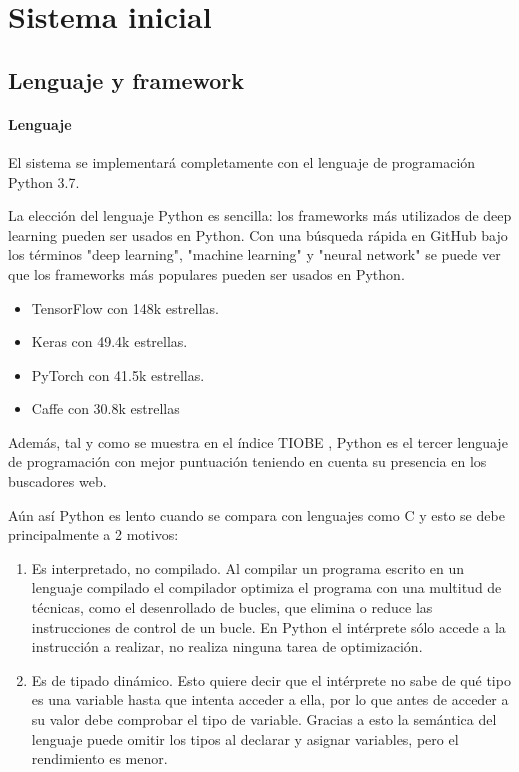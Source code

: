 \chapter{Sistema inicial}\label{initial_system}

\section{Lenguaje y framework}\label{sec:language_and_framework}

\subsubsection{Lenguaje}\label{subsec:language}

El sistema se implementará completamente con el lenguaje de programación Python 3.7.

La elección del lenguaje Python es sencilla: los frameworks más utilizados de deep learning pueden ser usados en Python. Con una búsqueda rápida en GitHub bajo los términos "deep learning", "machine learning" y "neural network" se puede ver que los frameworks más populares pueden ser usados en Python.
\begin{itemize}
\item TensorFlow con 148k estrellas.
\item Keras con 49.4k estrellas.
\item PyTorch con 41.5k estrellas.
\item Caffe con 30.8k estrellas
\end{itemize}

Además, tal y como se muestra en el índice TIOBE \cite{Tiobe2020}, Python es el tercer lenguaje de programación con mejor puntuación teniendo en cuenta su presencia en los buscadores web.

Aún así Python es lento cuando se compara con lenguajes como C y esto se debe principalmente a 2 motivos:
\begin{enumerate}
\item Es interpretado, no compilado. Al compilar un programa escrito en un lenguaje compilado el compilador optimiza el programa con una multitud de técnicas, como el desenrollado de bucles, que elimina o reduce las instrucciones de control de un bucle. En Python el intérprete sólo accede a la instrucción a realizar, no realiza ninguna tarea de optimización.
\item Es de tipado dinámico. Esto quiere decir que el intérprete no sabe de qué tipo es una variable hasta que intenta acceder a ella, por lo que antes de acceder a su valor debe comprobar el tipo de variable. Gracias a esto la semántica del lenguaje puede omitir los tipos al declarar y asignar variables, pero el rendimiento es menor.
\end{enumerate}

